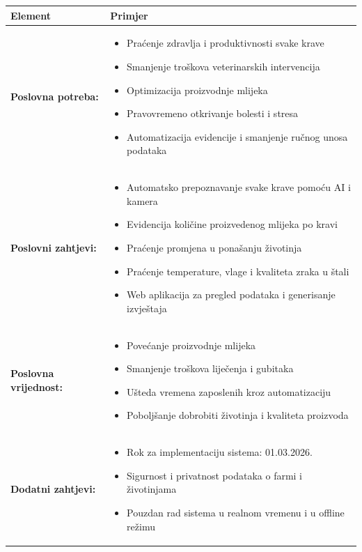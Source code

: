 \documentclass{article}
\begin{document}
\begin{table}[h!]
\renewcommand{\arraystretch}{1.4}
\setlength{\tabcolsep}{10pt}
\begin{tabularx}{\textwidth}{|>{\bfseries}l|X|}
\hline
\rowcolor[gray]{0.9}
\textbf{Element} & \textbf{Primjer} \\
\hline
Poslovna potreba: &
\begin{itemize}
 \item Praćenje zdravlja i produktivnosti svake krave
 \item Smanjenje troškova veterinarskih intervencija
 \item Optimizacija proizvodnje mlijeka
 \item Pravovremeno otkrivanje bolesti i stresa
 \item Automatizacija evidencije i smanjenje ručnog unosa podataka
\end{itemize} \\
\hline
Poslovni zahtjevi: &
\begin{itemize}
\item Automatsko prepoznavanje svake krave pomoću AI i kamera
 \item Evidencija količine proizvedenog mlijeka po kravi
 \item Praćenje promjena u ponašanju životinja
 \item Praćenje temperature, vlage i kvaliteta zraka u štali
 \item Web aplikacija za pregled podataka i generisanje izvještaja
\end{itemize} \\
\hline
Poslovna vrijednost: &
\begin{itemize}
 \item Povećanje proizvodnje mlijeka
 \item Smanjenje troškova liječenja i gubitaka
 \item Ušteda vremena zaposlenih kroz automatizaciju
 \item Poboljšanje dobrobiti životinja i kvaliteta proizvoda
\end{itemize} \\
\hline
Dodatni zahtjevi: &
\begin{itemize}
 \item Rok za implementaciju sistema: 01.03.2026.
 \item Sigurnost i privatnost podataka o farmi i životinjama
 \item Pouzdan rad sistema u realnom vremenu i u offline režimu
\end{itemize} \\
\hline

\end{tabularx}
\end{table}
\end{document}
